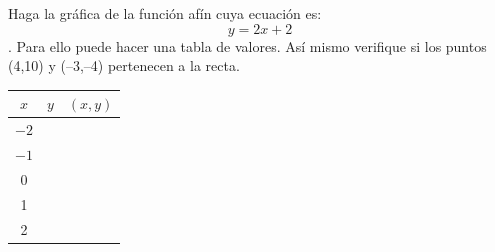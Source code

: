 \documentclass[fleqn]{article}
\begin{document}
\begin{enumerate}
\begin{minipage}{.3\textwidth}
\item Haga la gráfica de la función afín cuya ecuación es: \[y=2x+2\]. Para ello puede hacer una tabla de valores. Así mismo verifique si los puntos (4,10) y (--3,--4) pertenecen a la recta.
\end{minipage}
\begin{minipage}{.4\textwidth}
\end{minipage}
\begin{minipage}{.3\textwidth}
\begin{tabular}{|c|c|c|}
\hline 
$x$ & $y$ & $(x,y)$ \\ 
\hline 
$-2$ &  &  \\ 
\hline 
$-1$ &  &  \\ 
\hline 
0 &  &  \\ 
\hline 
1 &  &  \\ 
\hline 
2 &  &  \\ 
\hline 
\end{tabular} 
\end{minipage}\noanswer


\end{enumerate}
\end{document}

